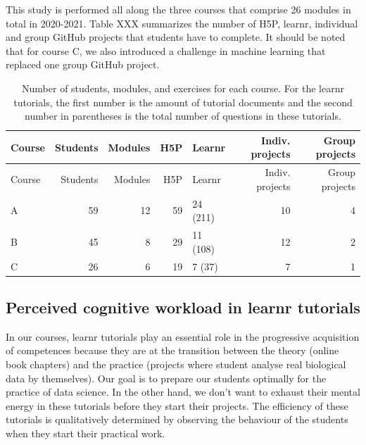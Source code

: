 \documentclass[
]{article}
\begin{document}
This study is performed all along the three courses that comprise 26
modules in total in 2020-2021. Table XXX summarizes the number of H5P,
learnr, individual and group GitHub projects that students have to
complete. It should be noted that for course C, we also introduced a
challenge in machine learning that replaced one group GitHub project.

\begin{longtable}[]{@{}lrrrlrr@{}}
\caption{Number of students, modules, and exercises for each course. For
the learnr tutorials, the first number is the amount of tutorial
documents and the second number in parentheses is the total number of
questions in these tutorials.}\tabularnewline
\toprule
Course & Students & Modules & H5P & Learnr & Indiv. projects & Group
projects \\
\midrule
\endfirsthead
\toprule
Course & Students & Modules & H5P & Learnr & Indiv. projects & Group
projects \\
\midrule
\endhead
A & 59 & 12 & 59 & 24 (211) & 10 & 4 \\
B & 45 & 8 & 29 & 11 (108) & 12 & 2 \\
C & 26 & 6 & 19 & 7 (37) & 7 & 1 \\
\bottomrule
\end{longtable}

\hypertarget{perceived-cognitive-workload-in-learnr-tutorials}{%
\subsection{Perceived cognitive workload in learnr
tutorials}\label{perceived-cognitive-workload-in-learnr-tutorials}}

In our courses, learnr tutorials play an essential role in the
progressive acquisition of competences because they are at the
transition between the theory (online book chapters) and the practice
(projects where student analyse real biological data by themselves). Our
goal is to prepare our students optimally for the practice of data
science. In the other hand, we don't want to exhaust their mental energy
in these tutorials before they start their projects. The efficiency of
these tutorials is qualitatively determined by observing the behaviour
of the students when they start their practical work.
\end{document}
